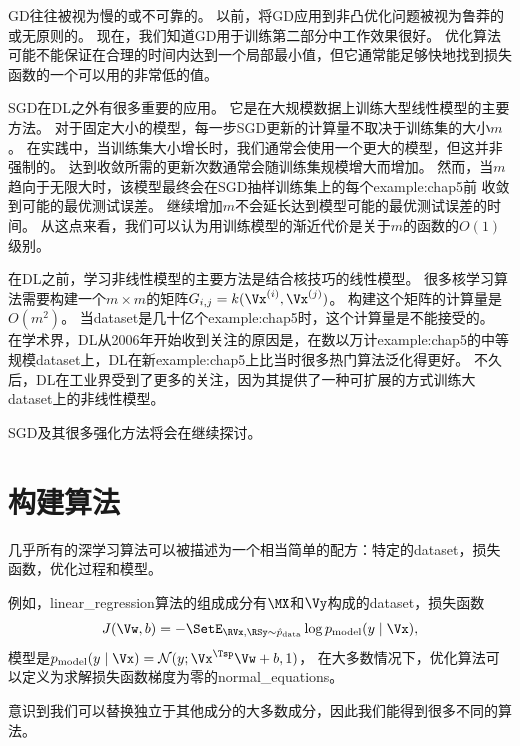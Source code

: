 \gls{GD}往往被视为慢的或不可靠的。
以前，将\gls{GD}应用到非凸优化问题被视为鲁莽的或无原则的。
现在，我们知道\gls{GD}用于训练第二部分中工作效果很好。
优化算法可能不能保证在合理的时间内达到一个局部最小值，但它通常能足够快地找到损失函数的一个可以用的非常低的值。 


\gls{SGD}在\gls{DL}之外有很多重要的应用。
它是在大规模数据上训练大型线性模型的主要方法。
对于固定大小的模型，每一步\gls{SGD}更新的计算量不取决于训练集的大小$m$。
在实践中，当训练集大小增长时，我们通常会使用一个更大的模型，但这并非强制的。
达到收敛所需的更新次数通常会随训练集规模增大而增加。
然而，当$m$趋向于无限大时，该模型最终会在\gls{SGD}抽样训练集上的每个\gls{example:chap5}前
收敛到可能的最优测试误差。
继续增加$m$不会延长达到模型可能的最优测试误差的时间。
从这点来看，我们可以认为用训练模型的渐近代价是关于$m$的函数的$O(1)$级别。

在\gls{DL}之前，学习非线性模型的主要方法是结合核技巧的线性模型。
很多核学习算法需要构建一个$m\times m$的矩阵$G_{i,j}=k(\Vx^{(i)}, \Vx^{(j)})$。
构建这个矩阵的计算量是$O(m^2)$。
当\gls{dataset}是几十亿个\gls{example:chap5}时，这个计算量是不能接受的。
在学术界，\gls{DL}从2006年开始收到关注的原因是，在数以万计\gls{example:chap5}的中等规模\gls{dataset}上，\gls{DL}在新\gls{example:chap5}上比当时很多热门算法泛化得更好。
不久后，\gls{DL}在工业界受到了更多的关注，因为其提供了一种可扩展的方式训练大\gls{dataset}上的非线性模型。

\gls{SGD}及其很多强化方法将会在继续探讨。

\section{构建算法}
\label{sec:building_a_machine_learning_algorithm}
几乎所有的深学习算法可以被描述为一个相当简单的配方：特定的\gls{dataset}，损失函数，优化过程和模型。

例如，\gls{linear_regression}算法的组成成分有$\MX$和$\Vy$构成的\gls{dataset}，损失函数
\begin{equation}
    J(\Vw, b) = -\SetE_{\RVx,\RSy\sim\hat{p}_{\text{data}}}
    \log p_{\text{model}} (y \mid \Vx) ,
\end{equation}
模型是$p_{\text{model}} (y \mid \Vx) = \mathcal{N}(y; \Vx^\Tsp \Vw + b, 1)$，
在大多数情况下，优化算法可以定义为求解损失函数梯度为零的\gls{normal_equations}。

意识到我们可以替换独立于其他成分的大多数成分，因此我们能得到很多不同的算法。

